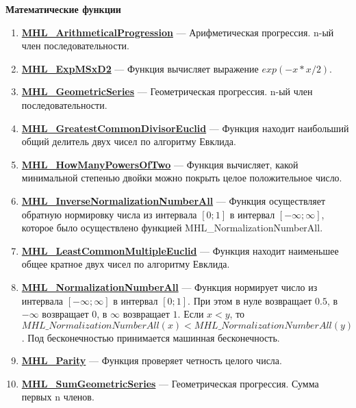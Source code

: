\documentclass[a4paper,12pt]{article}
\begin{document}
\textbf{Математические функции}
\begin{enumerate}

\item \textbf{\hyperref[MHL_ArithmeticalProgression]{MHL\_ArithmeticalProgression}} --- Арифметическая прогрессия. n-ый член последовательности.

\item \textbf{\hyperref[MHL_ExpMSxD2]{MHL\_ExpMSxD2}} --- Функция вычисляет выражение $exp(-x*x/2)$.

\item \textbf{\hyperref[MHL_GeometricSeries]{MHL\_GeometricSeries}} --- Геометрическая прогрессия. n-ый член последовательности.

\item \textbf{\hyperref[MHL_GreatestCommonDivisorEuclid]{MHL\_GreatestCommonDivisorEuclid}} --- Функция находит наибольший общий делитель двух чисел по алгоритму Евклида.

\item \textbf{\hyperref[MHL_HowManyPowersOfTwo]{MHL\_HowManyPowersOfTwo}} --- Функция вычисляет, какой минимальной степенью двойки можно покрыть целое положительное число.

\item \textbf{\hyperref[MHL_InverseNormalizationNumberAll]{MHL\_InverseNormalizationNumberAll}} --- Функция осуществляет обратную нормировку числа из интервала $\left[0;1\right] $  в интервал $\left[-\infty;\infty \right] $, которое было осуществлено функцией MHL\_NormalizationNumberAll.

\item \textbf{\hyperref[MHL_LeastCommonMultipleEuclid]{MHL\_LeastCommonMultipleEuclid}} --- Функция находит наименьшее общее кратное двух чисел по алгоритму Евклида.

\item \textbf{\hyperref[MHL_NormalizationNumberAll]{MHL\_NormalizationNumberAll}} --- Функция нормирует число из интервала $\left[-\infty;\infty \right] $ в интервал $\left[0;1\right]$. При этом в нуле возвращает $0.5$, в $-\infty$ возвращает $0$, в $\infty$ возвращает $1$. Если $x<y$, то $MHL\_NormalizationNumberAll(x)<MHL\_NormalizationNumberAll(y)$. Под бесконечностью принимается машинная бесконечность.

\item \textbf{\hyperref[MHL_Parity]{MHL\_Parity}} --- Функция проверяет четность целого числа.

\item \textbf{\hyperref[MHL_SumGeometricSeries]{MHL\_SumGeometricSeries}} --- Геометрическая прогрессия. Сумма первых n членов.


\end{enumerate}
\end{document}
